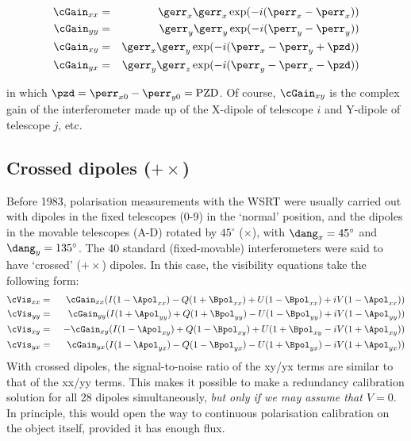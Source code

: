 \begin{eqnarray}
\cGain_{xx} &=& \gerr_x\gerr_x\exp(-i(\perr_x-\perr_x)) \nonumber \\
\cGain_{yy} &=& \gerr_y\gerr_y\exp(-i(\perr_y-\perr_y))\\
 \label{.equ.pol.016} %
\cGain_{xy} &=& \gerr_x\gerr_y\exp(-i(\perr_x-\perr_y+\pzd)) \nonumber \\
\cGain_{yx} &=& \gerr_y\gerr_z\exp(-i(\perr_y-\perr_x-\pzd))
\label{.equ.pol.018}
\end{eqnarray}

\noindent in which $\pzd=\perr_{x0}-\perr_{y0} = {\rm PZD}$. Of course,
$\cGain_{xy}$ is the complex gain of the interferometer made up of the X-dipole
of telescope $i$ and Y-dipole of telescope $j$, etc.


\subsection{Crossed dipoles ($+\times$)}

	Before 1983, polarisation measurements with the WSRT were usually
carried out with dipoles in the fixed telescopes (0-9) in the `normal'
position, and the dipoles in the movable telescopes (A-D) rotated by $45^\circ$
($\times$), with $\dang_x=45^\circ$ and $\dang_y=135^\circ$.  The 40 standard
(fixed-movable) interferometers were said to have `crossed' ($+\times$)
dipoles.  In this case, the visibility equations take the following form:
%
\begin{eqnarray}
\cVis_{xx} &=& \ \ \cGain_{xx}(I(1-\Apol_{xx}) -
	Q(1+\Bpol_{xx}) + U(1-\Bpol_{xx}) + iV(1-\Apol_{xx})) \nonumber \\
\cVis_{yy} &=& \ \ \cGain_{yy}(I(1+\Apol_{yy}) +
	Q(1+\Bpol_{yy}) - U(1-\Bpol_{yy}) + iV(1-\Apol_{yy})) \nonumber \\
\cVis_{xy} &=& -\cGain_{xy}(I(1-\Apol_{xy}) +
	Q(1-\Bpol_{xy}) + U(1+\Bpol_{xy} - iV(1+\Apol_{xy})) \nonumber \\
\cVis_{yx} &=& \ \ \cGain_{yx}(I(1-\Apol_{yx}) -
	Q(1-\Bpol_{yx}) - U(1+\Bpol_{yx}) - iV(1+\Apol_{yx}))
\label{.equ.pol.022}
\end{eqnarray}
%
	With crossed dipoles, the signal-to-noise ratio of the xy/yx terms are
similar to that of the xx/yy terms.  This makes it possible to make a
redundancy calibration solution for all 28 dipoles simultaneously, {\em but
only if we may assume that $V=0$}.  In principle, this would open the way to
continuous polarisation calibration on the object itself, provided it has
enough flux.

